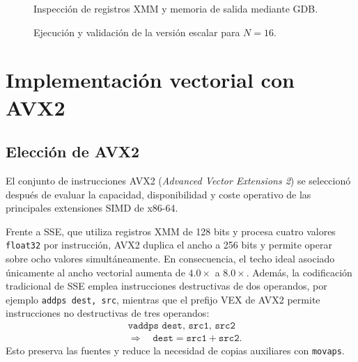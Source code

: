 \documentclass[journal]{IEEEtran}
\begin{document}
\begin{figure}[H]
  \centering
  \caption{Inspección de registros XMM y memoria de salida mediante GDB.}
  \label{fig:gdb-escalar-xmm}
\end{figure}

\begin{figure}[H]
  \centering
  \caption{Ejecución y validación de la versión escalar para $N=16$.}
  \label{fig:salida-escalar-n16}
\end{figure}

\section{Implementación vectorial con AVX2}

\subsection{Elección de AVX2}

El conjunto de instrucciones AVX2 (\textit{Advanced Vector Extensions 2}) se
seleccionó después de evaluar la capacidad, disponibilidad y coste operativo de
las principales extensiones SIMD de x86-64.

Frente a SSE, que utiliza registros XMM de 128 bits y procesa cuatro valores
\texttt{float32} por instrucción, AVX2 duplica el ancho a 256 bits y permite
operar sobre ocho valores simultáneamente. En consecuencia, el techo ideal
asociado únicamente al ancho vectorial aumenta de $4.0\times$ a $8.0\times$.
Además, la codificación tradicional de SSE emplea instrucciones destructivas de
dos operandos, por ejemplo \texttt{addps dest, src}, mientras que el prefijo VEX
de AVX2 permite instrucciones no destructivas de tres operandos:
\begin{equation}
  \begin{aligned}
    &\texttt{vaddps dest, src1, src2} \\
    &\Longrightarrow\quad
      \texttt{dest}=\texttt{src1}+\texttt{src2}.
  \end{aligned}
  \label{eq:vex-three-operands}
\end{equation}
Esto preserva las fuentes y reduce la necesidad de copias auxiliares con
\texttt{movaps}.
\end{document}
